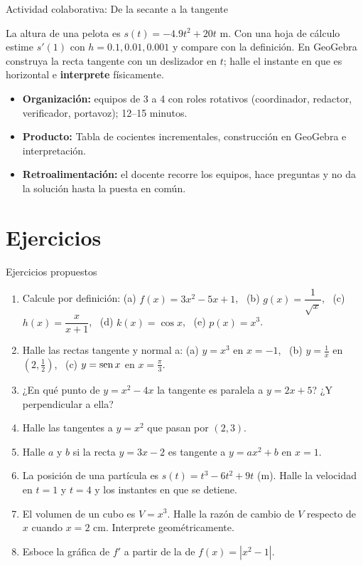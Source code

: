 \documentclass[10pt,aspectratio=169]{beamer}
\begin{document}
\begin{frame}{Actividad colaborativa: De la secante a la tangente}
  \small
  \begin{activa}
    La altura de una pelota es $s(t)=-4.9t^2+20t$ m. Con una hoja de cálculo estime $s'(1)$ con $h=0.1,0.01,0.001$ y compare con la definición. En GeoGebra construya la recta tangente con un deslizador en $t$; halle el instante en que es horizontal e \textbf{interprete} físicamente.
  \end{activa}
  \begin{itemize}
    \item \textbf{Organización:} equipos de 3 a 4 con roles rotativos (coordinador, redactor, verificador, portavoz); 12--15 minutos.
    \item \textbf{Producto:} Tabla de cocientes incrementales, construcción en GeoGebra e interpretación.
    \item \textbf{Retroalimentación:} el docente recorre los equipos, hace preguntas y no da la solución hasta la puesta en común.
  \end{itemize}
\end{frame}

\section{Ejercicios}

\begin{frame}{Ejercicios propuestos}
  \small
  \begin{ejercicio}
    \begin{enumerate}
      \item Calcule por definición: (a) $f(x)=3x^2-5x+1$, \ (b) $g(x)=\dfrac{1}{\sqrt x}$, \ (c) $h(x)=\dfrac{x}{x+1}$, \ (d) $k(x)=\cos x$, \ (e) $p(x)=x^3$.
      \item Halle las rectas tangente y normal a: (a) $y=x^3$ en $x=-1$, \ (b) $y=\frac{1}{x}$ en $\left(2,\frac12\right)$, \ (c) $y=\operatorname{sen} x$ en $x=\frac\pi3$.
      \item ¿En qué punto de $y=x^2-4x$ la tangente es paralela a $y=2x+5$? ¿Y perpendicular a ella?
      \item Halle las tangentes a $y=x^2$ que pasan por $(2,3)$.
      \item Halle $a$ y $b$ si la recta $y=3x-2$ es tangente a $y=ax^2+b$ en $x=1$.
      \item La posición de una partícula es $s(t)=t^3-6t^2+9t$ (m). Halle la velocidad en $t=1$ y $t=4$ y los instantes en que se detiene.
      \item El volumen de un cubo es $V=x^3$. Halle la razón de cambio de $V$ respecto de $x$ cuando $x=2$ cm. Interprete geométricamente.
      \item Esboce la gráfica de $f'$ a partir de la de $f(x)=|x^2-1|$.
    \end{enumerate}
  \end{ejercicio}
\end{frame}
\end{document}
